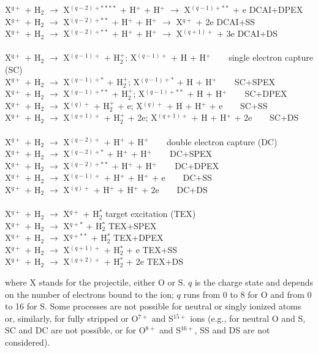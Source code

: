 \documentclass[draft]{agujournal2018}
\begin{document}
\begin{tabbing}
\> X$^{q+}$ + H$_2$ $\rightarrow$ X$^{(q-2)+****}$ + H$^+$ + H$^+$ $\rightarrow$ X$^{(q-1)+**}$ + e  \>  \> DCAI+DPEX \\
\> X$^{q+}$ + H$_2$ $\rightarrow$ X$^{(q-2)+**}$ + H$^+$ + H$^+$ $\rightarrow$ X$^{q+}$ + 2e  \>  \> DCAI+SS \\
\> X$^{q+}$ + H$_2$ $\rightarrow$ X$^{(q-2)+**}$ + H$^+$ + H$^+$ $\rightarrow$ X$^{(q+1)+}$ + 3e  \>  \> DCAI+DS \\
\\
\> X$^{q+}$ + H$_2$ $\rightarrow$ X$^{(q-1)+}$ + H$_2^+$;  X$^{(q-1)+}$ + H + H$^+$ \> $\;\;\;\;\;$ \> single electron capture (SC) \\
\> X$^{q+}$ + H$_2$ $\rightarrow$ X$^{(q-1)+*}$ + H$_2^+$;  X$^{(q-1)+*}$ + H + H$^+$ \> $\;\;\;\;\;$ \> SC+SPEX \\
\> X$^{q+}$ + H$_2$ $\rightarrow$ X$^{(q-1)+**}$ + H$_2^+$;  X$^{(q-1)+**}$ + H + H$^+$ \> $\;\;\;\;\;$ \> SC+DPEX \\
\> X$^{q+}$ + H$_2$ $\rightarrow$ X$^{(q)+}$ + H$_2^+$ + e;  X$^{(q)+}$ + H + H$^+$ + e \> $\;\;\;\;\;$ \> SC+SS \\
\> X$^{q+}$ + H$_2$ $\rightarrow$ X$^{(q+1)+}$ + H$_2^+$ + 2e;  X$^{(q+1)+}$ + H + H$^+$ + 2e \> $\;\;\;\;\;$ \> SC+DS \\
\\
\> X$^{q+}$ + H$_2$ $\rightarrow$ X$^{(q-2)+}$ + H$^+$ + H$^+$ \> $\;\;\;\;\;$ \> double electron capture (DC) \\
\> X$^{q+}$ + H$_2$ $\rightarrow$ X$^{(q-2)+*}$ + H$^+$ + H$^+$ \> $\;\;\;\;\;$ \> DC+SPEX \\
\> X$^{q+}$ + H$_2$ $\rightarrow$ X$^{(q-2)+**}$ + H$^+$ + H$^+$ \> $\;\;\;\;\;$ \> DC+DPEX \\
\> X$^{q+}$ + H$_2$ $\rightarrow$ X$^{(q-1)+}$ + H$^+$ + H$^+$ + e \> $\;\;\;\;\;$ \> DC+SS \\
\> X$^{q+}$ + H$_2$ $\rightarrow$ X$^{(q)+}$ + H$^+$ + H$^+$ + 2e \> $\;\;\;\;\;$ \> DC+DS \\
\\
\> X$^{q+}$ + H$_2$ $\rightarrow$ X$^{q+}$ + H$_2^*$  \> \> target excitation (TEX) \\
\> X$^{q+}$ + H$_2$ $\rightarrow$ X$^{q+*}$ + H$_2^*$  \> \> TEX+SPEX \\
\> X$^{q+}$ + H$_2$ $\rightarrow$ X$^{q+**}$ + H$_2^*$  \> \> TEX+DPEX \\
\> X$^{q+}$ + H$_2$ $\rightarrow$ X$^{(q+1)+}$ + H$_2^*$ + e  \> \> TEX+SS \\
\> X$^{q+}$ + H$_2$ $\rightarrow$ X$^{(q+2)+}$ + H$_2^*$ + 2e \> \> TEX+DS
\end{tabbing}
where X stands for the projectile, either O or S. $q$ is the charge state and depends on the number of electrons bound to the ion; $q$ runs from 0 to 8 for O and from 0 to 16 for S.
Some processes are not possible for neutral or singly ionized atoms or, similarly, for fully stripped or O$^{7+}$ and S$^{15+}$ ions (e.g., for neutral O and S, SC and DC are not possible, or for O$^{8+}$ and S$^{16+}$, SS and DS are not considered).
\end{document}
